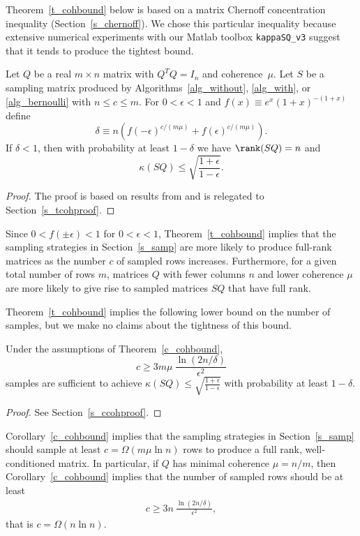\documentclass{siamltex}
\begin{document}
Theorem~\ref{t_cohbound} below is based on a
matrix Chernoff concentration inequality (Section~\ref{s_chernoff}). 
We chose this particular inequality because extensive numerical experiments
with our Matlab toolbox \texttt{kappaSQ\_v3} \cite{impl}
suggest that it tends to produce the tightest bound.

\begin{theorem}\label{t_cohbound}
Let $Q$ be a real $m\times n$ matrix with $Q^TQ=I_n$ and coherence~$\mu$.
Let $S$ be a sampling matrix produced by 
Algorithms~\ref{alg_without}, \ref{alg_with}, or \ref{alg_bernoulli}
with $n\leq c\leq m$.
For $0<\epsilon<1$ and $f(x)\equiv e^x(1+x)^{-(1+x)}$ define
$$\delta\equiv n\left(f(-\epsilon)^{c/(m\mu)}+
f(\epsilon)^{c/(m\mu)}\right).$$
If $\delta<1$, then with probability at least $1-\delta$ we have
$\rank(SQ)=n$ and
$$\kappa(SQ)\leq \sqrt{\frac{1+\epsilon}{1-\epsilon}}.$$
\end{theorem}

\begin{proof} 
The proof is based on results from \cite{GT11,tropp11b,tropp11} and is 
relegated to Section~\ref{s_tcohproof}.
\end{proof}

Since $0<f(\pm\epsilon)<1$ for $0<\epsilon<1$,
Theorem~\ref{t_cohbound} implies that the sampling strategies
in Section~\ref{s_samp} are more likely to produce 
full-rank matrices as the number $c$ of sampled rows increases. Furthermore,
for a given total number of rows $m$, matrices $Q$ with fewer columns $n$
and lower coherence $\mu$ are more likely to give rise to 
sampled matrices $SQ$ that have full rank.

Theorem~\ref{t_cohbound} 
implies the following lower bound on the number of samples, but we make no
claims about the tightness of this bound.

\begin{corollary}\label{c_cohbound}
Under the assumptions of Theorem~\ref{c_cohbound},
$$c\geq 3m\mu\>\frac{\ln(2n/\delta)}{\epsilon^2}$$
samples are sufficient to achieve $\kappa(SQ)\leq \sqrt{\tfrac{1+\epsilon}{1-\epsilon}}$
with probability at least $1-\delta$.

\end{corollary}
\begin{proof} See Section~\ref{s_ccohproof}.
\end{proof}

Corollary~\ref{c_cohbound} implies that the sampling strategies
in Section~\ref{s_samp}
should sample at least $c=\Omega\left(m\mu\ln{n}\right)$ rows to 
produce a full rank, well-conditioned matrix.
In particular, if $Q$ has minimal coherence $\mu=n/m$, then 
Corollary~\ref{c_cohbound} implies that the number of sampled rows
should be at least
\begin{eqnarray}\label{e_nmcoh}
c\geq 3n \> \frac{\ln(2n/\delta)}{\epsilon^2},
\end{eqnarray}
that is $c=\Omega\left(n\ln{n}\right)$.
\end{document}
